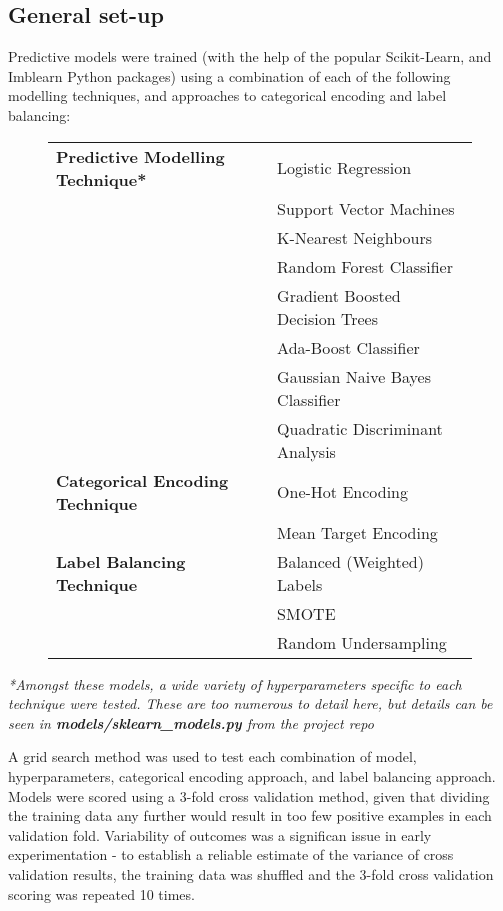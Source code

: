 \subsection{General set-up}\label{subsec:general-set-up}
Predictive models were trained (with the help of the popular Scikit-Learn\cite{scikit-learn}, and Imblearn \cite{imblearn} Python packages) using a combination of each of the following modelling techniques, and approaches to categorical encoding and label balancing:

\begin{figure}[H]
    \centering
    \begin{tabular}{ll}
        \toprule
        \textbf{Predictive Modelling Technique*} & Logistic Regression \\
        & Support Vector Machines         \\
        & K-Nearest Neighbours            \\
        & Random Forest Classifier        \\
        & Gradient Boosted Decision Trees \\
        & Ada-Boost Classifier            \\
        & Gaussian Naive Bayes Classifier \\
        & Quadratic Discriminant Analysis \\
        \midrule
        \textbf{Categorical Encoding Technique} & One-Hot Encoding \\
        & Mean Target Encoding \\
        \midrule
        \textbf{Label Balancing Technique} & Balanced (Weighted) Labels \\
        & SMOTE \\
        & Random Undersampling \\
        \toprule
    \end{tabular}
\end{figure}

\textit{*Amongst these models, a wide variety of hyperparameters specific to each technique were tested. These are too numerous to detail here, but details can be seen in \linebreak\textbf{models/sklearn\_models.py} from the project repo}

A grid search method was used to test each combination of model, hyperparameters, categorical encoding approach, and label balancing approach. Models were scored using a 3-fold cross validation method, given that dividing the training data any further would result in too few positive examples in each validation fold. Variability of outcomes was a significan issue in early experimentation - to establish a reliable estimate of the variance of cross validation results, the training data was shuffled and the 3-fold cross validation scoring was repeated 10 times.


